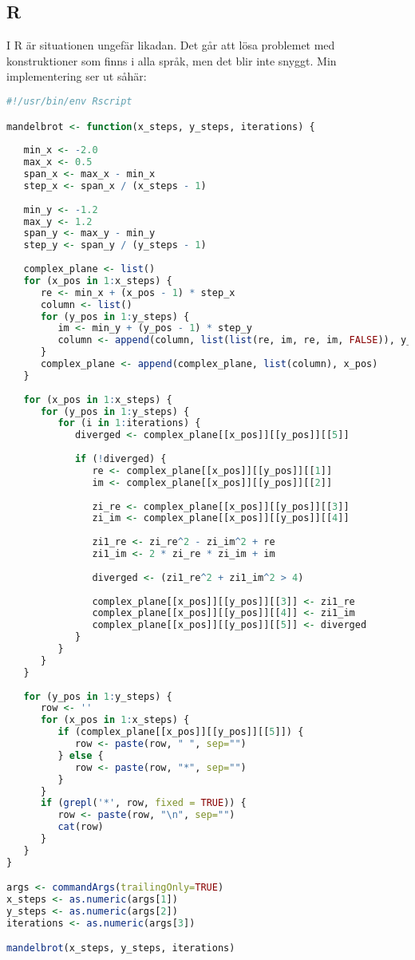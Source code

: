 \documentclass[10pt, twoside,a4paper]{article}
\begin{document}
\subsection{R}
I R är situationen ungefär likadan. Det går att lösa problemet med konstruktioner som finns i alla språk, men det blir inte snyggt. Min implementering ser ut såhär:
\begin{lstlisting}[language=R]
#!/usr/bin/env Rscript

mandelbrot <- function(x_steps, y_steps, iterations) {
   
   min_x <- -2.0
   max_x <- 0.5
   span_x <- max_x - min_x
   step_x <- span_x / (x_steps - 1)
   
   min_y <- -1.2
   max_y <- 1.2
   span_y <- max_y - min_y
   step_y <- span_y / (y_steps - 1)
   
   complex_plane <- list()
   for (x_pos in 1:x_steps) {
      re <- min_x + (x_pos - 1) * step_x
      column <- list()
      for (y_pos in 1:y_steps) {
         im <- min_y + (y_pos - 1) * step_y
         column <- append(column, list(list(re, im, re, im, FALSE)), y_pos)
      }
      complex_plane <- append(complex_plane, list(column), x_pos)
   }
   
   for (x_pos in 1:x_steps) {
      for (y_pos in 1:y_steps) {
         for (i in 1:iterations) { 
            diverged <- complex_plane[[x_pos]][[y_pos]][[5]]
            
            if (!diverged) {
               re <- complex_plane[[x_pos]][[y_pos]][[1]]
               im <- complex_plane[[x_pos]][[y_pos]][[2]]
               
               zi_re <- complex_plane[[x_pos]][[y_pos]][[3]]
               zi_im <- complex_plane[[x_pos]][[y_pos]][[4]]
               
               zi1_re <- zi_re^2 - zi_im^2 + re
               zi1_im <- 2 * zi_re * zi_im + im
               
               diverged <- (zi1_re^2 + zi1_im^2 > 4)
               
               complex_plane[[x_pos]][[y_pos]][[3]] <- zi1_re
               complex_plane[[x_pos]][[y_pos]][[4]] <- zi1_im
               complex_plane[[x_pos]][[y_pos]][[5]] <- diverged
            }
         }
      }
   }
   
   for (y_pos in 1:y_steps) {
      row <- ''
      for (x_pos in 1:x_steps) {
         if (complex_plane[[x_pos]][[y_pos]][[5]]) {
            row <- paste(row, " ", sep="")
         } else {
            row <- paste(row, "*", sep="")
         }
      }
      if (grepl('*', row, fixed = TRUE)) {
         row <- paste(row, "\n", sep="")
         cat(row)
      }
   }
}

args <- commandArgs(trailingOnly=TRUE)
x_steps <- as.numeric(args[1])
y_steps <- as.numeric(args[2])
iterations <- as.numeric(args[3])

mandelbrot(x_steps, y_steps, iterations)
\end{lstlisting}
\end{document}
